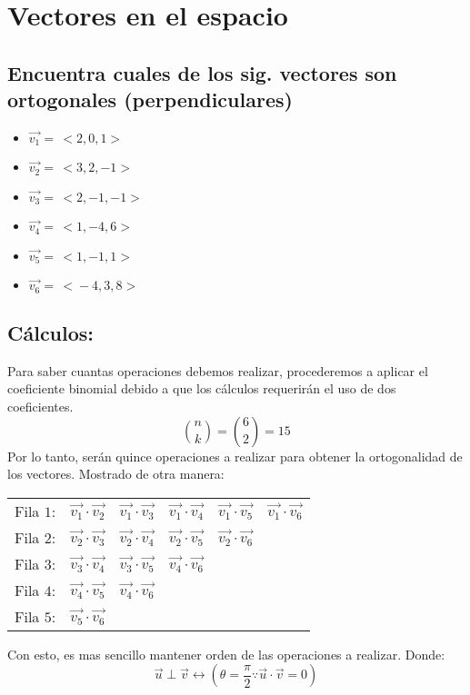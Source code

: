 \documentclass[letterpaper, 12pt]{article}
\begin{document}
\setcounter{page}{1}
\thispagestyle{fancy}
\section{Vectores en el espacio}
\subsection*{Encuentra cuales de los sig. vectores son ortogonales (perpendiculares)}
\justify
\begin{itemize}
    \item \(\vec{v_1}=\,<\!2,0,1\!>\)
    \item \(\vec{v_2}=\,<\!3,2,-1\!>\)
    \item \(\vec{v_3}=\,<\!2,-1,-1\!>\)
    \item \(\vec{v_4}=\,<\!1,-4,6\!>\)
    \item \(\vec{v_5}=\,<\!1,-1,1\!>\)
    \item \(\vec{v_6}=\,<\!-4,3,8\!>\)
\end{itemize}
\subsection*{Cálculos:}
\justify
Para saber cuantas operaciones debemos realizar, procederemos a aplicar el coeficiente binomial debido a que los cálculos requerirán el uso de dos coeficientes.
\[\binom{n}{k} =\binom{6}{2} =15\]
Por lo tanto, serán quince operaciones a realizar para obtener la ortogonalidad de los vectores. Mostrado de otra manera:
\begin{center}
    \begin{tabular}{ c c c c c c }
    Fila \(1\):& \(\vec{v_1}\cdot\vec{v_2}\)& \(\vec{v_1}\cdot\vec{v_3}\)& \(\vec{v_1}\cdot\vec{v_4}\)& \(\vec{v_1}\cdot\vec{v_5}\)& \(\vec{v_1}\cdot\vec{v_6}\)\\
    Fila \(2\):& \(\vec{v_2}\cdot\vec{v_3}\)&\(\vec{v_2}\cdot\vec{v_4}\)&\(\vec{v_2}\cdot\vec{v_5}\)&\(\vec{v_2}\cdot\vec{v_6}\)&  \\
    Fila \(3\):& \(\vec{v_3}\cdot\vec{v_4}\)&\(\vec{v_3}\cdot\vec{v_5}\)&\(\vec{v_4}\cdot\vec{v_6}\)& & \\
    Fila \(4\):& \(\vec{v_4}\cdot\vec{v_5}\)&\(\vec{v_4}\cdot\vec{v_6}\)& & & \\
    Fila \(5\):& \(\vec{v_5}\cdot\vec{v_6}\)& & & &
    \end{tabular}
\end{center}
Con esto, es mas sencillo mantener orden de las operaciones a realizar. Donde:
\[\vec{u}\perp \vec{v} \leftrightarrow \left(\theta=\frac{\pi}{2} \because \vec{u}\cdot\vec{v}=0\right)\]
\end{document}

